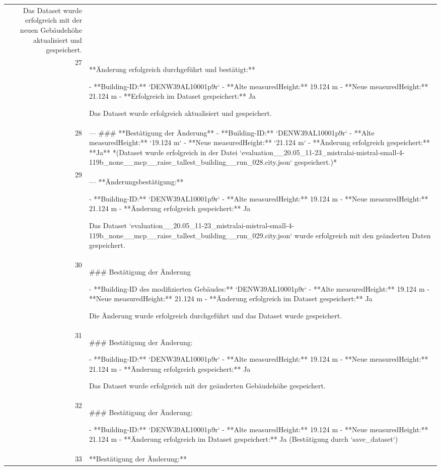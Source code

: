 \documentclass[a4paper,11pt]{article}
\begin{document}
\begin{table}[ht]
\begin{tabular}{r p{12cm}}
Das Dataset wurde erfolgreich mit der neuen Gebäudehöhe aktualisiert und gespeichert. \\
27 & **Änderung erfolgreich durchgeführt und bestätigt:**

- **Building-ID:** `DENW39AL10001p9r`
- **Alte measuredHeight:** 19.124 m
- **Neue measuredHeight:** 21.124 m
- **Erfolgreich im Dataset gespeichert:** Ja

Das Dataset wurde erfolgreich aktualisiert und gespeichert. \\
28 & ---
\#\#\# **Bestätigung der Änderung**
- **Building-ID:** `DENW39AL10001p9r`
- **Alte measuredHeight:** `19.124 m`
- **Neue measuredHeight:** `21.124 m`
- **Änderung erfolgreich gespeichert:** **Ja**
  *(Dataset wurde erfolgreich in der Datei `evaluation\_\_20.05\_11-23\_mistralai-mistral-small-4-119b\_none\_\_mcp\_\_raise\_tallest\_building\_\_run\_028.city.json` gespeichert.)* \\
29 & ---
**Änderungsbestätigung:**

- **Building-ID:** `DENW39AL10001p9r`
- **Alte measuredHeight:** 19.124 m
- **Neue measuredHeight:** 21.124 m
- **Änderung erfolgreich gespeichert:** Ja

Das Dataset `evaluation\_\_20.05\_11-23\_mistralai-mistral-small-4-119b\_none\_\_mcp\_\_raise\_tallest\_building\_\_run\_029.city.json` wurde erfolgreich mit den geänderten Daten gespeichert. \\
30 & \#\#\# Bestätigung der Änderung

- **Building-ID des modifizierten Gebäudes:** `DENW39AL10001p9r`
- **Alte measuredHeight:** 19.124 m
- **Neue measuredHeight:** 21.124 m
- **Änderung erfolgreich im Dataset gespeichert:** Ja

Die Änderung wurde erfolgreich durchgeführt und das Dataset wurde gespeichert. \\
31 & \#\#\# Bestätigung der Änderung:

- **Building-ID:** `DENW39AL10001p9r`
- **Alte measuredHeight:** 19.124 m
- **Neue measuredHeight:** 21.124 m
- **Änderung erfolgreich gespeichert:** Ja

Das Dataset wurde erfolgreich mit der geänderten Gebäudehöhe gespeichert. \\
32 & \#\#\# Bestätigung der Änderung:

- **Building-ID:** `DENW39AL10001p9r`
- **Alte measuredHeight:** 19.124 m
- **Neue measuredHeight:** 21.124 m
- **Änderung erfolgreich im Dataset gespeichert:** Ja (Bestätigung durch `save\_dataset`) \\
33 & **Bestätigung der Änderung:**


\end{tabular}
\end{table}
\end{document}
